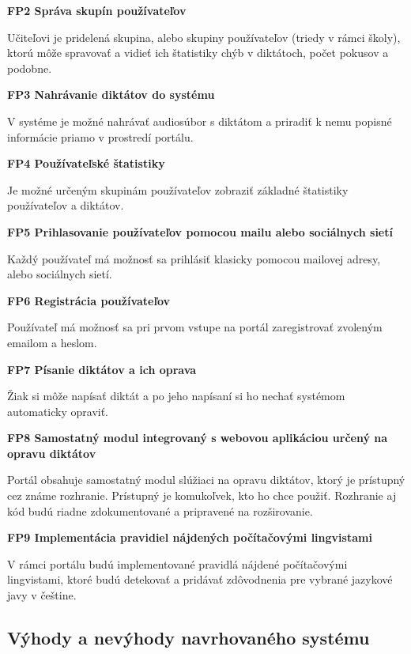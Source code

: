 \documentclass[12pt,oneside]{fithesis2}
\begin{document}
\bigskip
     \textbf{FP2 Správa skupín používateľov}  
     \par Učiteľovi je pridelená skupina, alebo skupiny používateľov (triedy v rámci školy), ktorú môže spravovať a vidieť ich štatistiky chýb v diktátoch, počet pokusov a podobne.
     
\bigskip
     \textbf{FP3 Nahrávanie diktátov do systému}  
     \par V systéme je možné nahrávať audiosúbor s diktátom a priradiť k nemu popisné informácie priamo v prostredí portálu.     

\bigskip
     \textbf{FP4 Používateľské štatistiky}  
     \par Je možné určeným skupinám používateľov zobraziť základné štatistiky používateľov a diktátov.
     
\bigskip
     \textbf{FP5 Prihlasovanie používateľov pomocou mailu alebo sociálnych sietí}  
	\par Každý používateľ má možnosť sa prihlásiť klasicky pomocou mailovej adresy, alebo sociálnych sietí.
	
\bigskip
     \textbf{FP6 Registrácia používateľov}
     \par Používateľ má možnosť sa pri prvom vstupe na portál zaregistrovať zvoleným emailom a heslom.
     
\bigskip
     \textbf{FP7 Písanie diktátov a ich oprava} 
     \par Žiak si môže napísať diktát a po jeho napísaní si ho nechať systémom automaticky opraviť.
     
\bigskip
     \textbf{FP8 Samostatný modul integrovaný s webovou aplikáciou určený na opravu diktátov} 
     \par Portál obsahuje samostatný modul slúžiaci na opravu diktátov, ktorý je prístupný cez známe rozhranie. Prístupný je komukoľvek, kto ho chce použiť. Rozhranie aj kód budú riadne zdokumentované a pripravené na rozširovanie.         

\bigskip
     \textbf{FP9 Implementácia pravidiel nájdených počítačovými lingvistami}      		
	\par V rámci portálu budú implementované pravidlá nájdené počítačovými lingvistami, ktoré budú detekovať a pridávať zdôvodnenia pre vybrané jazykové javy v češtine.

    \subsection{Výhody a nevýhody navrhovaného systému}
    \pagebreak
\end{document}
